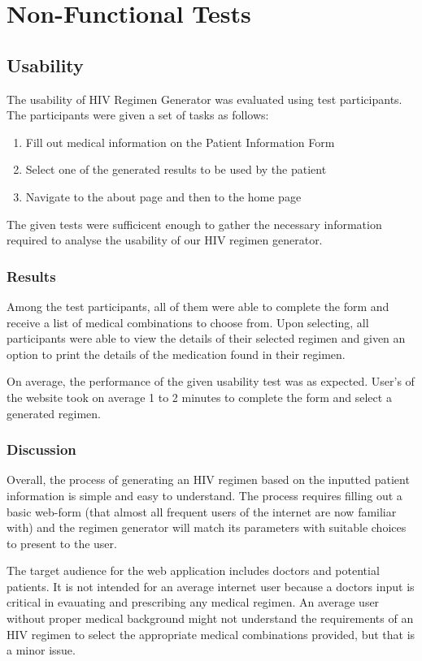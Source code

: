 \documentclass[12pt]{article}
\begin{document}
\section{Non-Functional Tests}
\subsection{Usability}
The usability of HIV Regimen Generator was evaluated using test participants. The participants were given a set of tasks as follows: 
\begin{enumerate}
\item Fill out medical information on the Patient Information Form
\item Select one of the generated results to be used by the patient
\item Navigate to the about page and then to the home page
\end{enumerate}
The given tests were sufficicent enough to gather the necessary information required to analyse the usability of our HIV regimen generator. 

\subsubsection{Results}
Among the test participants, all of them were able to complete the form and receive a list of medical combinations to choose from. Upon selecting, all participants were able to view the details of their selected regimen and given an option to print the details of the medication found in their regimen. 

On average, the performance of the given usability test was as expected. User's of the website took on average 1 to 2 minutes to complete the form and select a generated regimen. 

\subsubsection{Discussion}
Overall, the process of generating an HIV regimen based on the inputted patient information is simple and easy to understand. The process requires filling out a basic web-form (that almost all frequent users of the internet are now familiar with) and the regimen generator will match its parameters with suitable choices to present to the user. 

The target audience for the web application includes doctors and potential patients. It is not intended for an average internet user because a doctors input is critical in evauating and prescribing any medical regimen. An average user without proper medical background might not understand the requirements of an HIV regimen to  select the appropriate medical combinations provided, but that is a minor issue. 
\end{document}
